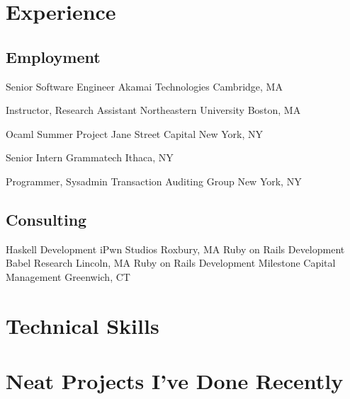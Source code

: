 \documentclass[10pt,letterpaper,sans]{moderncv}
\begin{document}
\makecvtitle

\section{Experience}

\subsection{Employment}

        {Senior Software Engineer}
        {Akamai Technologies}
        {Cambridge, MA}
        {}{}

        {Instructor, Research Assistant}
        {Northeastern University}
        {Boston, MA}
        {}{}

        {Ocaml Summer Project}
        {Jane Street Capital}
        {New York, NY}
        {}{}

        {Senior Intern}
        {Grammatech}
        {Ithaca, NY}
        {}{}

        {Programmer, Sysadmin}
        {Transaction Auditing Group}
        {New York, NY}
        {}{}

\subsection{Consulting}

        {Haskell Development}
        {iPwn Studios}
        {Roxbury, MA}
        {}{}
\cventry{}
        {Ruby on Rails Development}
        {Babel Research}
        {Lincoln, MA}
        {}{}
\cventry{}
        {Ruby on Rails Development}
        {Milestone Capital Management}
        {Greenwich, CT}
        {}{}

\section{Technical Skills}



\section{Neat Projects I've Done Recently}
\end{document}
